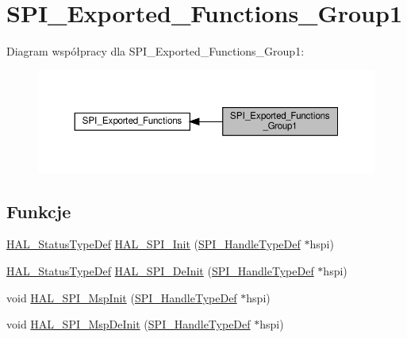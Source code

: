\hypertarget{group___s_p_i___exported___functions___group1}{}\section{S\+P\+I\+\_\+\+Exported\+\_\+\+Functions\+\_\+\+Group1}
\label{group___s_p_i___exported___functions___group1}
Diagram współpracy dla S\+P\+I\+\_\+\+Exported\+\_\+\+Functions\+\_\+\+Group1\+:\nopagebreak
\begin{figure}[H]
\begin{center}
\leavevmode
\includegraphics[width=350pt]{group___s_p_i___exported___functions___group1}
\end{center}
\end{figure}
\subsection*{Funkcje}
\begin{DoxyCompactItemize}
\item 
\hyperlink{stm32f4xx__hal__def_8h_a63c0679d1cb8b8c684fbb0632743478f}{H\+A\+L\+\_\+\+Status\+Type\+Def} \hyperlink{group___s_p_i___exported___functions___group1_gaadb9d40e710c714d96b2501996658c44}{H\+A\+L\+\_\+\+S\+P\+I\+\_\+\+Init} (\hyperlink{group___s_p_i___exported___types_gab3bd115785297692c125528b7293566b}{S\+P\+I\+\_\+\+Handle\+Type\+Def} $\ast$hspi)
\item 
\hyperlink{stm32f4xx__hal__def_8h_a63c0679d1cb8b8c684fbb0632743478f}{H\+A\+L\+\_\+\+Status\+Type\+Def} \hyperlink{group___s_p_i___exported___functions___group1_gaca2db2a7bbed96ac013c565080fb61f2}{H\+A\+L\+\_\+\+S\+P\+I\+\_\+\+De\+Init} (\hyperlink{group___s_p_i___exported___types_gab3bd115785297692c125528b7293566b}{S\+P\+I\+\_\+\+Handle\+Type\+Def} $\ast$hspi)
\item 
void \hyperlink{group___s_p_i___exported___functions___group1_ga17f583be14b22caffa6c4e56dcd035ef}{H\+A\+L\+\_\+\+S\+P\+I\+\_\+\+Msp\+Init} (\hyperlink{group___s_p_i___exported___types_gab3bd115785297692c125528b7293566b}{S\+P\+I\+\_\+\+Handle\+Type\+Def} $\ast$hspi)
\item 
void \hyperlink{group___s_p_i___exported___functions___group1_gabadc4d4974af1afd943e8d13589068e1}{H\+A\+L\+\_\+\+S\+P\+I\+\_\+\+Msp\+De\+Init} (\hyperlink{group___s_p_i___exported___types_gab3bd115785297692c125528b7293566b}{S\+P\+I\+\_\+\+Handle\+Type\+Def} $\ast$hspi)
\end{DoxyCompactItemize}


